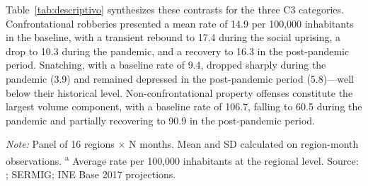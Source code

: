 \documentclass[pdflatex,sn-basic]{sn-jnl}
\newcommand{\tablenote}[1]{%
  \vspace{2pt}%
  {\par\footnotesize\textit{Note:} #1\par}%
}
\begin{document}
Table~\ref{tab:descriptivo} synthesizes these contrasts for the three C3 categories. Confrontational robberies presented a mean rate of 14.9 per 100,000 inhabitants in the baseline, with a transient rebound to 17.4 during the social uprising, a drop to 10.3 during the pandemic, and a recovery to 16.3 in the post-pandemic period. Snatching, with a baseline rate of 9.4, dropped sharply during the pandemic (3.9) and remained depressed in the post-pandemic period (5.8)---well below their historical level. Non-confrontational property offenses constitute the largest volume component, with a baseline rate of 106.7, falling to 60.5 during the pandemic and partially recovering to 90.9 in the post-pandemic period.

\begin{table}[htbp]
\centering
\caption{Descriptive statistics by period and C3 category (regional panel)}
\label{tab:descriptivo}
\footnotesize
{}
\tablenote{Panel of 16 regions $\times$ N months. Mean and SD calculated on region-month observations. \textsuperscript{a} Average rate per 100,000 inhabitants at the regional level. Source: \citet{INE2026}; SERMIG; INE Base 2017 projections.}
\end{table}
\end{document}
